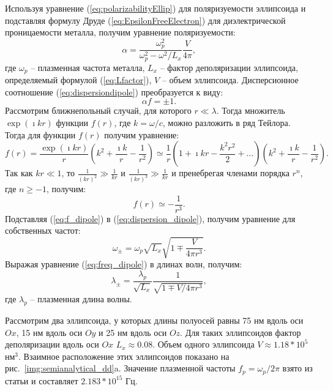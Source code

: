 Используя уравнение (\ref{eq:polarizabilityEllip}) для поляризуемости эллипсоида и подставляя формулу Друде (\ref{eq:EpsilonFreeElectron}) для диэлектрической проницаемости металла, получим уравнение поляризуемости:
\begin{equation}
\alpha = \frac{\omega_p^2}{\omega_p^2 - \omega ^2 / L_x} \frac{V}{4 \pi},
\label{eq:polarizability_dipole}
\end{equation}
где $ \omega_p $ -- плазменная частота металла, $ L_x $ -- фактор деполяризации эллипсоида, определяемый формулой (\ref{eq:Lfactor}), $ V $ -- объем эллипсоида. Дисперсионное соотношение (\ref{eq:dispersiondipole}) преобразуется к виду:
\begin{equation}
\alpha f = \pm 1.
\label{eq:dispersion_dipole}
\end{equation}
Рассмотрим ближнепольный случай, для которого $ r \ll \lambda $. Тогда множитель $ \exp (\imath k r) $ функции $ f(r) $, где $ k = \omega / c $, можно разложить в ряд Тейлора. Тогда для функции $ f(r) $ получим уравнение:
\begin{equation}
f(r) = \frac{\exp (\imath k r)}{r} \left( k^2 + \frac{\imath k}{r} - \frac{1}{r^2} \right) \simeq \frac{1}{r} \left( 1 + \imath k r - \frac{k^2 r^2}{2} + ... \right) \left( k^2 + \frac{\imath k}{r} - \frac{1}{r^2} \right).
\label{eq:f_Taylor}
\end{equation}
Так как $ k r \ll 1 $, то $ \frac{1}{(kr)^2} \gg \frac{1}{kr} $ и $ \frac{1}{(kr)^3} \gg \frac{1}{kr} $ и пренебрегая членами порядка $ r^n $, где $ n \geq -1 $, получим:
\begin{equation}
f(r) \simeq - \frac{1}{r^3}.
\label{eq:f_dipole}
\end{equation}
Подставляя (\ref{eq:f_dipole}) в (\ref{eq:dispersion_dipole}), получим уравнение для собственных частот:
\begin{equation}
\omega_{\pm} = \omega_p \sqrt{L_x} \sqrt{1 \mp \frac{V}{4 \pi r^3}}.
\label{eq:freq_dipole}
\end{equation}
Выражая уравнение (\ref{eq:freq_dipole}) в длинах волн, получим:
\begin{equation}
\lambda_{\pm} = \frac{\lambda_p}{\sqrt{L_x}} \frac{1}{\sqrt{1 \mp V / 4 \pi r^3}},
\label{eq:wl_dipole}
\end{equation}
где $ \lambda_p $ -- плазменная длина волны.

Рассмотрим два эллипсоида, у которых длины полуосей равны 75 нм вдоль оси $ Ox $,  15 нм вдоль оси $ Oy $ и 25 нм вдоль оси $ Oz $.  Для таких эллипсоидов фактор деполяризации вдоль оси $ Ox $ $ L_x \approx 0.08  $. Объем одного эллипсоида $ V \approx 1.18*10^5 $ нм$ ^3 $. Взаимное расположение этих 
эллипсоидов показано на рис.~\ref{img:semianalytical_dd}a. Значение плазменной частоты $ f_p = \omega_p / 2 \pi $ взято из статьи \cite{plasma_freq} и составляет $ 2.183*10^{15} $ Гц.

